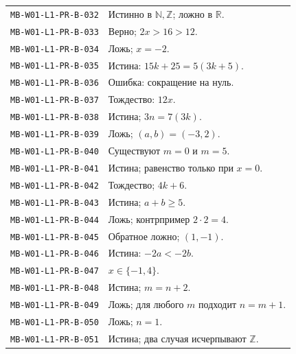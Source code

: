 \documentclass[11pt,a4paper,openany]{book}
\newcommand{\muid}[1]{\texttt{\footnotesize #1}}
\begin{document}
\begin{longtable}{p{}p{}}
\muid{MB-W01-L1-PR-B-032} & Истинно в $\mathbb N,\mathbb Z$; ложно в $\mathbb R$.\\

\muid{MB-W01-L1-PR-B-033} & Верно; $2x>16>12$.\\

\muid{MB-W01-L1-PR-B-034} & Ложь; $x=-2$.\\

\muid{MB-W01-L1-PR-B-035} & Истина: $15k+25=5(3k+5)$.\\

\muid{MB-W01-L1-PR-B-036} & Ошибка: сокращение на нуль.\\

\muid{MB-W01-L1-PR-B-037} & Тождество: $12x$.\\

\muid{MB-W01-L1-PR-B-038} & Истина; $3n=7(3k)$.\\

\muid{MB-W01-L1-PR-B-039} & Ложь; $(a,b)=(-3,2)$.\\

\muid{MB-W01-L1-PR-B-040} & Существуют $m=0$ и $m=5$.\\

\muid{MB-W01-L1-PR-B-041} & Истина; равенство только при $x=0$.\\

\muid{MB-W01-L1-PR-B-042} & Тождество; $4k+6$.\\

\muid{MB-W01-L1-PR-B-043} & Истина; $a+b\ge5$.\\

\muid{MB-W01-L1-PR-B-044} & Ложь; контрпример $2\cdot2=4$.\\

\muid{MB-W01-L1-PR-B-045} & Обратное ложно; $(1,-1)$.\\

\muid{MB-W01-L1-PR-B-046} & Истина: $-2a<-2b$.\\

\muid{MB-W01-L1-PR-B-047} & $x\in\{-1,4\}$.\\

\muid{MB-W01-L1-PR-B-048} & Истина; $m=n+2$.\\

\muid{MB-W01-L1-PR-B-049} & Ложь; для любого $m$ подходит $n=m+1$.\\

\muid{MB-W01-L1-PR-B-050} & Ложь; $n=1$.\\

\muid{MB-W01-L1-PR-B-051} & Истина; два случая исчерпывают $\mathbb Z$.\\


\end{longtable}
\end{document}
